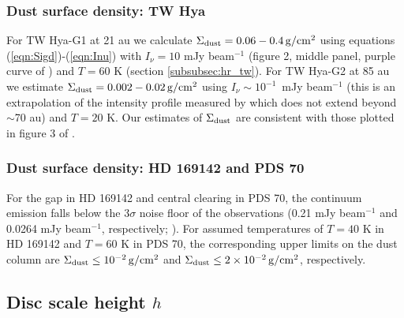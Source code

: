 \documentclass[fleqn,usenatbib]{mnras}
\newcommand{\Sigd}{\Sigma_{\rm dust}}
\newcommand{\gcm}{\rm g/cm^2}
\begin{document}
\subsubsection{Dust surface density: TW Hya}
\label{subsubsec:twhya}
For TW Hya-G1 at 21 au we calculate $\Sigd = %
0.06-0.4\,\gcm$ using equations (\ref{eqn:Sigd})-(\ref{eqn:Inu}) with $I_{\nu} = 10$ mJy beam$^{-1}$ (figure 2, middle panel, purple curve of \citealt{nomura_etal_2021}) and $T = 60$ K (section \ref{subsubsec:hr_tw}). For TW Hya-G2 at 85 au we estimate $\Sigd = 0.002-0.02\,\gcm$ using
$I_{\nu} \sim 10^{-1}\,$ mJy beam$^{-1}$ (this is an extrapolation of the intensity profile measured by \citealt{nomura_etal_2021} which does not extend beyond $\sim$70 au) and $T = 20$ K. Our estimates of $\Sigd$ are consistent with those plotted in figure 3 of \cite{nomura_etal_2021}.  

\subsubsection{Dust surface density: HD 169142 and PDS 70}
\label{subsubsec:dsd_hd169142_pds70}
For the gap in HD 169142 and central clearing in PDS 70, the continuum emission falls below the 3$\sigma$ noise floor of the observations (0.21 mJy beam$^{-1}$ and 0.0264 mJy beam$^{-1}$, respectively; 
\citealt{fedele_etal_2017, benisty_etal_2021}). For assumed temperatures of $T=40$ K in HD 169142 and $T = 60$ K in PDS 70, the corresponding upper limits on the dust column 
are $\Sigd \leq 10^{-2}\,\gcm$ and $\Sigd \leq 2 \times 10^{-2}\,\gcm$, respectively.

\subsection{Disc scale height $h$}
\label{subsec:hr}
\end{document}
